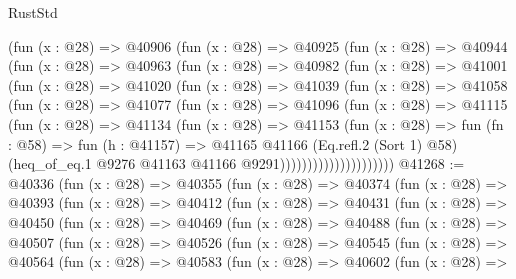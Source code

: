 \begin{lexlean}{RustStd}
\begin{coremodule}
{\begin{coremodule}
{{{{{{{{{{{{{{{{{{{{{{{{{{{{{{{{{{{{{{{{{{{{{{{{{{{{{{{              (fun (x : @28) =>
              @40906
                (fun (x : @28) =>
                @40925
                  (fun (x : @28) =>
                  @40944
                    (fun (x : @28) =>
                    @40963
                      (fun (x : @28) =>
                      @40982
                        (fun (x : @28) =>
                        @41001
                          (fun (x : @28) =>
                          @41020
                            (fun (x : @28) =>
                            @41039
                              (fun (x : @28) =>
                              @41058
                                (fun (x : @28) =>
                                @41077
                                  (fun (x : @28) =>
                                  @41096
                                    (fun (x : @28) =>
                                    @41115
                                      (fun (x : @28) =>
                                      @41134
                                        (fun (x : @28) =>
                                        @41153
                                          (fun (x : @28) =>
                                          fun (fn : @58) =>
                                          fun (h : @41157) =>
                                          @41165
                                            @41166
                                            (Eq.refl.{2} (Sort 1) @58)
                                            (heq_of_eq.{1}
                                              @9276
                                              @41163
                                              @41166
                                              @9291)))))))))))))))))))))
@41268 := @40336
    (fun (x : @28) =>
    @40355
      (fun (x : @28) =>
      @40374
        (fun (x : @28) =>
        @40393
          (fun (x : @28) =>
          @40412
            (fun (x : @28) =>
            @40431
              (fun (x : @28) =>
              @40450
                (fun (x : @28) =>
                @40469
                  (fun (x : @28) =>
                  @40488
                    (fun (x : @28) =>
                    @40507
                      (fun (x : @28) =>
                      @40526
                        (fun (x : @28) =>
                        @40545
                          (fun (x : @28) =>
                          @40564
                            (fun (x : @28) =>
                            @40583
                              (fun (x : @28) =>
                              @40602
                                (fun (x : @28) =>
}}}}}}}}}}}}}}}}}}}}}}}}}}}}}}}}}}}}}}}}}}}}}}}}}}}}}}}
\end{coremodule}}
\end{coremodule}
\end{lexlean}
